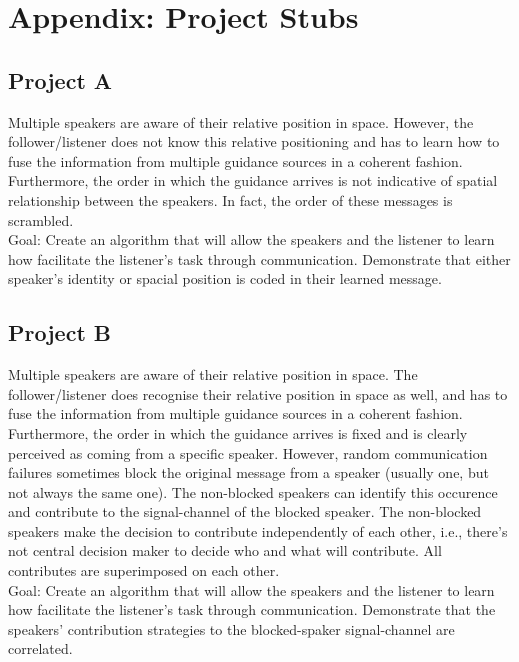 \documentclass[a4paper,11pt]{article}
\begin{document}
\printbibliography

\section*{Appendix: Project Stubs}
\subsection*{Project A}
Multiple speakers are aware of their relative position in space. However, the follower/listener does not know this relative positioning and has to learn how to fuse the information from multiple guidance sources in a coherent fashion. Furthermore, the order in which the guidance arrives is not indicative of spatial relationship between the speakers. In fact, the order of these messages is scrambled.
\\
Goal: Create an algorithm that will allow the speakers and the listener to learn how facilitate the listener's task through communication. Demonstrate that either speaker's identity or spacial position is coded in their learned message.

\subsection*{Project B}
Multiple speakers are aware of their relative position in space. The follower/listener does recognise their relative position in space as well, and has to fuse the information from multiple guidance sources in a coherent fashion. Furthermore, the order in which the guidance arrives is fixed and is clearly perceived as coming from a specific speaker. However, random communication failures sometimes block the original message from a speaker (usually one, but not always the same one). The non-blocked speakers can identify this occurence and contribute to the signal-channel of the blocked speaker. The non-blocked speakers make the decision to contribute independently of each other, i.e., there's not central decision maker to decide who and what will contribute. All contributes are superimposed on each other.
\\
Goal: Create an algorithm that will allow the speakers and the listener to learn how facilitate the listener's task through communication. Demonstrate that the speakers' contribution strategies to the blocked-spaker signal-channel are correlated. 
\end{document}
